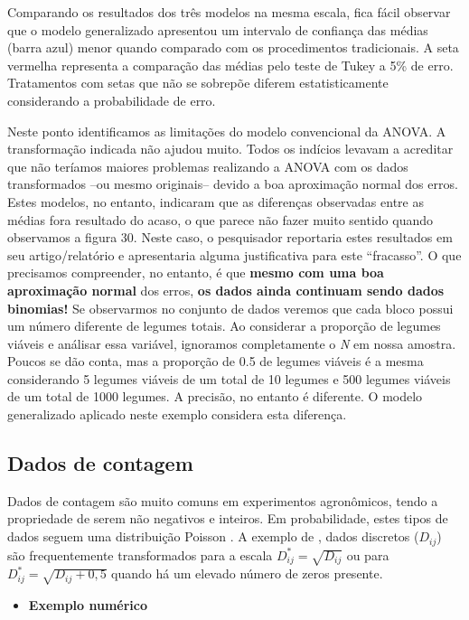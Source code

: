\documentclass[
]{book}
\providecommand{\tightlist}{%
  \setlength{\itemsep}{0pt}\setlength{\parskip}{0pt}}
\begin{document}
Comparando os resultados dos três modelos na mesma escala, fica fácil observar que o modelo generalizado apresentou um intervalo de confiança das médias (barra azul) menor quando comparado com os procedimentos tradicionais. A seta vermelha representa a comparação das médias pelo teste de Tukey a 5\% de erro. Tratamentos com setas que não se sobrepõe diferem estatisticamente considerando a probabilidade de erro.

Neste ponto identificamos as limitações do modelo convencional da ANOVA. A transformação indicada não ajudou muito. Todos os indícios levavam a acreditar que não teríamos maiores problemas realizando a ANOVA com os dados transformados --ou mesmo originais-- devido a boa aproximação normal dos erros. Estes modelos, no entanto, indicaram que as diferenças observadas entre as médias fora resultado do acaso, o que parece não fazer muito sentido quando observamos a figura 30. Neste caso, o pesquisador reportaria estes resultados em seu artigo/relatório e apresentaria alguma justificativa para este ``fracasso''. O que precisamos compreender, no entanto, é que \textbf{mesmo com uma boa aproximação normal} dos erros, \textbf{os dados ainda continuam sendo dados binomias!} Se observarmos no conjunto de dados veremos que cada bloco possui um número diferente de legumes totais. Ao considerar a proporção de legumes viáveis e análisar essa variável, ignoramos completamente o \emph{N} em nossa amostra. Poucos se dão conta, mas a proporção de 0.5 de legumes viáveis é a mesma considerando 5 legumes viáveis de um total de 10 legumes e 500 legumes viáveis de um total de 1000 legumes. A precisão, no entanto é diferente. O modelo generalizado aplicado neste exemplo considera esta diferença.

\hypertarget{dados-de-contagem}{%
\subsection{Dados de contagem}\label{dados-de-contagem}}

Dados de contagem são muito comuns em experimentos agronômicos, tendo a propriedade de serem não negativos e inteiros. Em probabilidade, estes tipos de dados seguem uma distribuição Poisson \citep{Cochran1940}. A exemplo de \citet{Zoz2018}, dados discretos (\(D_{ij}\)) são frequentemente transformados para a escala \(D^*_{ij} = \sqrt{D_{ij}}\) ou para \(D^*_{ij} = \sqrt{D_{ij}+0,5}\) quando há um elevado número de zeros presente.

\begin{itemize}
\tightlist
\item
  \textbf{Exemplo numérico}
\end{itemize}
\end{document}
